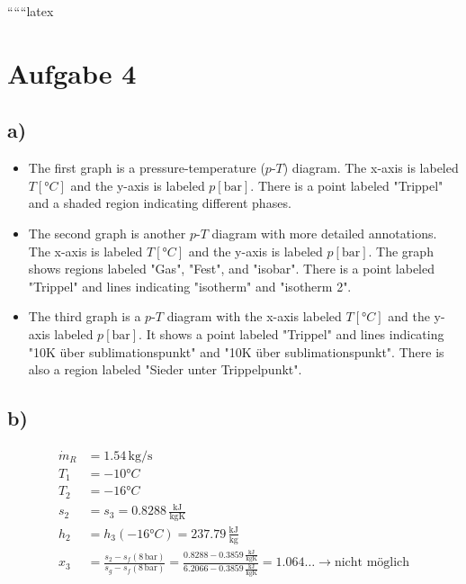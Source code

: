
``````latex


\section*{Aufgabe 4}

\subsection*{a)}

\begin{itemize}
    \item The first graph is a pressure-temperature ($p$-$T$) diagram. The x-axis is labeled $T [°C]$ and the y-axis is labeled $p [\text{bar}]$. There is a point labeled "Trippel" and a shaded region indicating different phases.
    \item The second graph is another $p$-$T$ diagram with more detailed annotations. The x-axis is labeled $T [°C]$ and the y-axis is labeled $p [\text{bar}]$. The graph shows regions labeled "Gas", "Fest", and "isobar". There is a point labeled "Trippel" and lines indicating "isotherm" and "isotherm 2".
    \item The third graph is a $p$-$T$ diagram with the x-axis labeled $T [°C]$ and the y-axis labeled $p [\text{bar}]$. It shows a point labeled "Trippel" and lines indicating "10K über sublimationspunkt" and "10K über sublimationspunkt". There is also a region labeled "Sieder unter Trippelpunkt".
\end{itemize}

\subsection*{b)}

\begin{align*}
    \dot{m}_R &= 1.54 \, \text{kg/s} \\
    T_1 &= -10°C \\
    T_2 &= -16°C \\
    s_2 &= s_3 = 0.8288 \, \frac{\text{kJ}}{\text{kgK}} \\
    h_2 &= h_3 \left( -16°C \right) = 237.79 \, \frac{\text{kJ}}{\text{kg}} \\
    x_3 &= \frac{s_2 - s_f (8 \, \text{bar})}{s_g - s_f (8 \, \text{bar})} = \frac{0.8288 - 0.3859 \, \frac{\text{kJ}}{\text{kgK}}}{6.2066 - 0.3859 \, \frac{\text{kJ}}{\text{kgK}}} = 1.064 \ldots \rightarrow \text{nicht möglich}
\end{align*}

